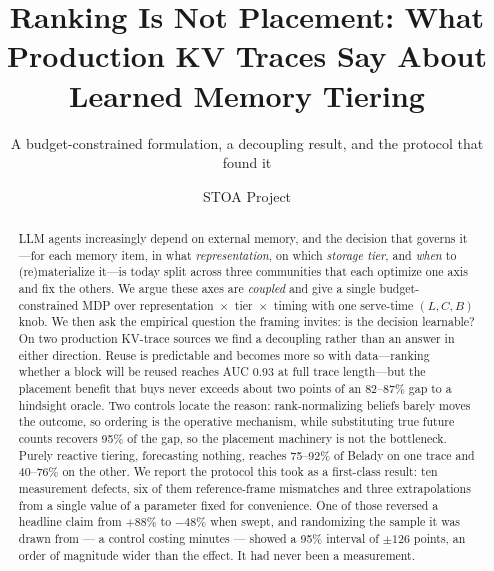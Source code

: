 \documentclass[sigconf,nonacm,10pt]{cidr-2027}
\begin{document}
\title{Ranking Is Not Placement: What Production KV Traces Say About Learned Memory Tiering}
\subtitle{A budget-constrained formulation, a decoupling result, and the protocol that found it}

\author{STOA Project}

\begin{abstract}
LLM agents increasingly depend on external memory, and the decision that governs it---for each memory
item, in what \emph{representation}, on which \emph{storage tier}, and \emph{when} to (re)materialize
it---is today split across three communities that each optimize one axis and fix the others. We argue
these axes are \emph{coupled} and give a single budget-constrained MDP over
representation~$\times$~tier~$\times$~timing with one serve-time $(L,C,B)$ knob. We then ask the
empirical question the framing invites: is the decision learnable? On two production KV-trace sources we
find a decoupling rather than an answer in either direction. Reuse is predictable and becomes more so
with data---ranking whether a block will be reused reaches AUC 0.93 at full trace length---but the
placement benefit that buys never exceeds about two points of an 82--87\% gap to a hindsight oracle. Two
controls locate the reason: rank-normalizing beliefs barely moves the outcome, so ordering is the
operative mechanism, while substituting true future counts recovers 95\% of the gap, so the placement
machinery is not the bottleneck. Purely reactive tiering, forecasting nothing, reaches 75--92\% of Belady
on one trace and 40--76\% on the other. We report the protocol this took as a first-class result: ten measurement
defects, six of them reference-frame mismatches and three extrapolations from a single value of a
parameter fixed for convenience. One of those reversed a headline claim from $+88\%$ to $-48\%$ when
swept, and randomizing the sample it was drawn from --- a control costing minutes --- showed a 95\%
interval of $\pm126$ points, an order of magnitude wider than the effect. It had never been a
measurement.
\end{abstract}


\maketitle












\end{document}
